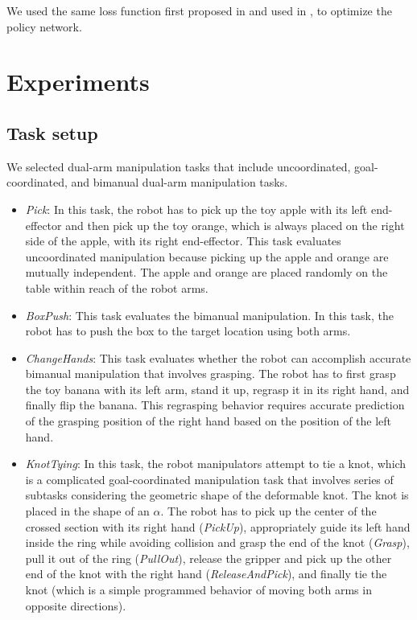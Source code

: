 \documentclass[letterpaper, 10 pt, conference]{ieeeconf}  %
\begin{document}
We used the same loss function first proposed in  \cite{zhang2018deep} and used in \cite{kim2021gaze}, \cite{kim2020using} to optimize the policy network.


\section{Experiments}
\subsection{Task setup}
We selected dual-arm manipulation tasks that include uncoordinated, goal-coordinated, and bimanual dual-arm manipulation tasks.

\begin{itemize}
    \item \textit{Pick}: In this task, the robot has to pick up the toy apple with its left end-effector and then pick up the toy orange, which is always placed on the right side of the apple, with its right end-effector. This task evaluates uncoordinated manipulation because picking up the apple and orange are mutually independent. The apple and orange are placed randomly on the table within reach of the robot arms.

    \item \textit{BoxPush}: This task evaluates the bimanual manipulation. In this task, the robot has to push the box to the target location using both arms. 
    
    \item \textit{ChangeHands}: This task evaluates whether the robot can accomplish accurate bimanual manipulation that involves grasping. The robot has to first grasp the toy banana with its left arm, stand it up, regrasp it in its right hand, and finally flip the banana. This regrasping behavior requires accurate prediction of the grasping position of the right hand based on the position of the left hand.
    
    \item \textit{KnotTying}: In this task, the robot manipulators attempt to tie a knot, which is a complicated goal-coordinated manipulation task that involves series of subtasks considering the geometric shape of the deformable knot. The knot is placed in the shape of an $\alpha$. The robot has to pick up the center of the crossed section with its right hand (\textit{PickUp}), appropriately guide its left hand inside the ring while avoiding collision and grasp the end of the knot (\textit{Grasp}), pull it out of the ring (\textit{PullOut}), release the gripper and pick up the other end of the knot with the right hand (\textit{ReleaseAndPick}), and finally tie the knot (which is a simple programmed behavior of moving both arms in opposite directions).%
\end{itemize}
\end{document}

